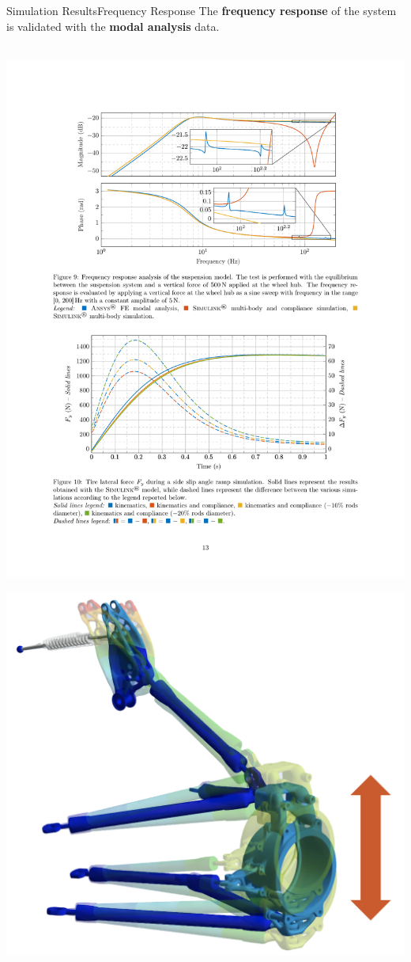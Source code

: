 \begin{frame}{Simulation Results}{Frequency Response}
  The \textbf{frequency response} of the system is validated with the \Ansys{} \textbf{modal analysis} data. \\[1.0em]
  \begin{minipage}[c]{0.69\linewidth}
     \\[0.25em]
    \includegraphics[width=1.0\linewidth]{./figures/frequency_response_simulations.pdf}
  \end{minipage}
  \hfill
  \begin{minipage}[c]{0.3\linewidth}
    \includegraphics[width=0.5\linewidth]{./figures/mode1.png}  \\

\end{minipage}
\end{frame}
